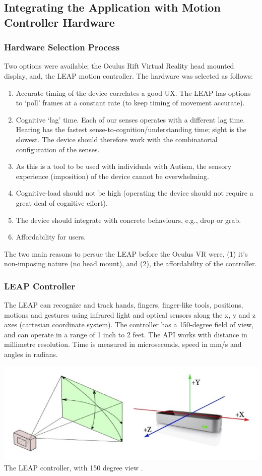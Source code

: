 \documentclass[a4paper, 10pt]{article}
\begin{document}
\subsection{Integrating the Application with Motion Controller Hardware }\label{hardware}
\subsubsection{Hardware Selection Process}
Two options were available; the Oculus Rift Virtual Reality head mounted display, and, the LEAP motion controller. The hardware was selected as follows: 
\begin{enumerate}
\item Accurate timing of the device correlates a good UX. The LEAP has options to ‘poll’ frames at a constant rate (to keep timing of movement accurate).
\item Cognitive ‘lag’ time. Each of our senses operates with a different lag time. Hearing has the fastest sense-to-cognition/understanding time; sight is the slowest. The device should therefore work with the combinatorial configuration of the senses.
\item As this is a tool to be used with individuals with Autism, the sensory experience (imposition) of the device cannot be overwhelming.
\item Cognitive-load should not be high (operating the device should not require a great deal of cognitive effort).
\item The device should integrate with concrete behaviours, e.g., drop or grab. 
\item Affordability for users.
\end{enumerate}
The two main reasons to persue the LEAP before the Oculus VR were, (1) it's non-imposing nature (no head mount), and (2), the affordability of the controller.

\subsubsection{LEAP Controller}
The LEAP can recognize and track hands, fingers, finger-like tools, positions, motions and gestures using infrared light and optical sensors along the x, y and z axes (cartesian coordinate system). The controller has a 150-degree field of view, and can operate in a range of 1 inch to 2 feet. The API works with distance in millimetre resolution. Time is measured in microseconds, speed in mm/s and angles in radians.

\begin{center}
\includegraphics[scale=0.4]{leap}\\
The LEAP controller, with 150 degree view \cite{leap}.
\end{center}
\end{document}
